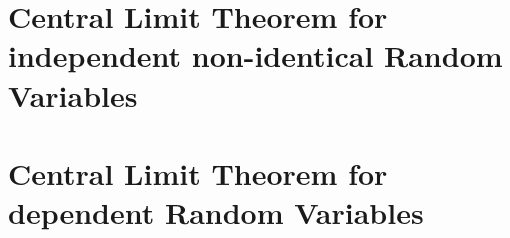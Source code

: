 \section{Central Limit Theorem for independent non-identical Random Variables}

\begin{theorem}

\end{theorem}

\section{Central Limit Theorem for dependent Random Variables}
